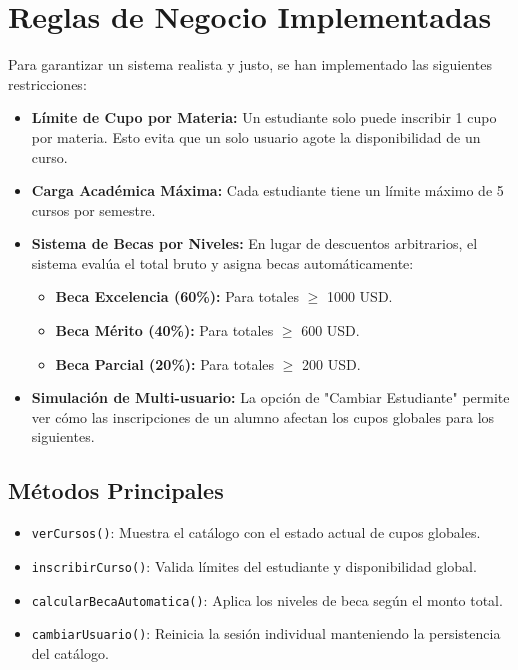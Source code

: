 \documentclass[12pt,a4paper]{article}
\begin{document}
\section{Reglas de Negocio Implementadas}
Para garantizar un sistema realista y justo, se han implementado las siguientes restricciones:
\begin{itemize}
    \item \textbf{Límite de Cupo por Materia:} Un estudiante solo puede inscribir 1 cupo por materia. Esto evita que un solo usuario agote la disponibilidad de un curso.
    \item \textbf{Carga Académica Máxima:} Cada estudiante tiene un límite máximo de 5 cursos por semestre.
    \item \textbf{Sistema de Becas por Niveles:} En lugar de descuentos arbitrarios, el sistema evalúa el total bruto y asigna becas automáticamente:
        \begin{itemize}
            \item \textbf{Beca Excelencia (60\%):} Para totales $\geq$ 1000 USD.
            \item \textbf{Beca Mérito (40\%):} Para totales $\geq$ 600 USD.
            \item \textbf{Beca Parcial (20\%):} Para totales $\geq$ 200 USD.
        \end{itemize}
    \item \textbf{Simulación de Multi-usuario:} La opción de "Cambiar Estudiante" permite ver cómo las inscripciones de un alumno afectan los cupos globales para los siguientes.
\end{itemize}

\subsection{Métodos Principales}
\begin{itemize}
    \item \texttt{verCursos()}: Muestra el catálogo con el estado actual de cupos globales.
    \item \texttt{inscribirCurso()}: Valida límites del estudiante y disponibilidad global.
    \item \texttt{calcularBecaAutomatica()}: Aplica los niveles de beca según el monto total.
    \item \texttt{cambiarUsuario()}: Reinicia la sesión individual manteniendo la persistencia del catálogo.
\end{itemize}
\end{document}

